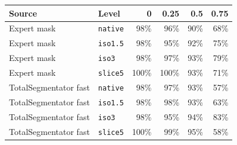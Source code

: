 \begin{tabular}{llrrrr}
\toprule
Source & Level & 0 & 0.25 & 0.5 & 0.75 \\
\midrule
Expert mask & \texttt{native} & 98\% & 96\% & 90\% & 68\% \\
Expert mask & \texttt{iso1.5} & 98\% & 95\% & 92\% & 75\% \\
Expert mask & \texttt{iso3} & 98\% & 97\% & 93\% & 79\% \\
Expert mask & \texttt{slice5} & 100\% & 100\% & 93\% & 71\% \\
\midrule
TotalSegmentator fast & \texttt{native} & 98\% & 97\% & 93\% & 57\% \\
TotalSegmentator fast & \texttt{iso1.5} & 98\% & 98\% & 93\% & 63\% \\
TotalSegmentator fast & \texttt{iso3} & 98\% & 95\% & 94\% & 83\% \\
TotalSegmentator fast & \texttt{slice5} & 100\% & 99\% & 95\% & 58\% \\
\bottomrule
\end{tabular}
